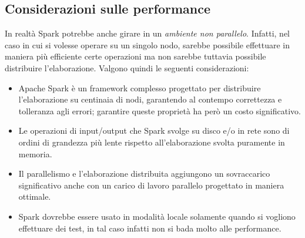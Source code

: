 \documentclass[titlepage]{article}
\begin{document}
\subsection{Considerazioni sulle performance}
In realtà Spark potrebbe anche girare in un \textit{ambiente non parallelo}. Infatti, nel caso in cui si volesse operare su un singolo nodo, sarebbe possibile effettuare in maniera più efficiente certe operazioni ma non sarebbe tuttavia possibile distribuire l'elaborazione. Valgono quindi le seguenti considerazioni:
\begin{itemize}
    \item Apache Spark è un framework complesso progettato per distribuire l'elaborazione su centinaia di nodi, garantendo al contempo correttezza e tolleranza agli errori; garantire queste proprietà ha però un costo significativo.
    \item Le operazioni di input/output che Spark svolge su disco e/o in rete sono di ordini di grandezza più lente rispetto all'elaborazione svolta puramente in memoria.
    \item Il parallelismo e l'elaborazione distribuita aggiungono un sovraccarico significativo anche con un carico di lavoro parallelo progettato in maniera ottimale.
    \item Spark dovrebbe essere usato in modalità locale solamente quando si vogliono effettuare dei test, in tal caso infatti non si bada molto alle performance.
\end{itemize}
\end{document}
